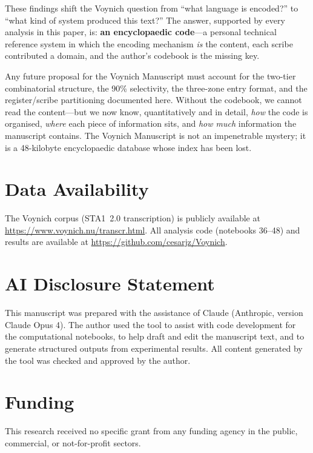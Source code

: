 These findings shift the Voynich question from ``what language is encoded?'' to ``what kind of system produced this text?''  The answer, supported by every analysis in this paper, is: \textbf{an encyclopaedic code}---a personal technical reference system in which the encoding mechanism \emph{is} the content, each scribe contributed a domain, and the author's codebook is the missing key.

Any future proposal for the Voynich Manuscript must account for the two-tier combinatorial structure, the 90\% selectivity, the three-zone entry format, and the register/scribe partitioning documented here.  Without the codebook, we cannot read the content---but we now know, quantitatively and in detail, \emph{how} the code is organised, \emph{where} each piece of information sits, and \emph{how much} information the manuscript contains.  The Voynich Manuscript is not an impenetrable mystery; it is a 48-kilobyte encyclopaedic database whose index has been lost.



\section*{Data Availability}

The Voynich corpus (STA1~2.0 transcription) is publicly available at \url{https://www.voynich.nu/transcr.html}.  All analysis code (notebooks 36--48) and results are available at \url{https://github.com/cesarjz/Voynich}.

\section*{AI Disclosure Statement}

This manuscript was prepared with the assistance of Claude (Anthropic, version Claude Opus 4).  The author used the tool to assist with code development for the computational notebooks, to help draft and edit the manuscript text, and to generate structured outputs from experimental results.  All content generated by the tool was checked and approved by the author.

\section*{Funding}

This research received no specific grant from any funding agency in the public, commercial, or not-for-profit sectors.

